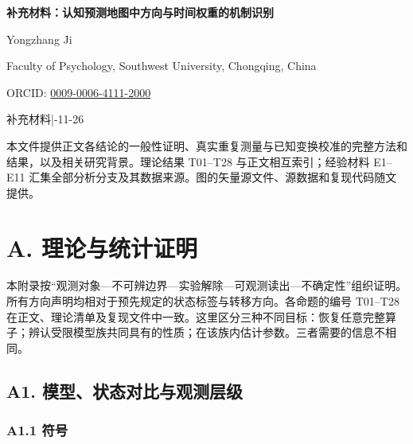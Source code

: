\documentclass[11pt,a4paper]{article}
\begin{document}
\thispagestyle{plain}
{\raggedright{}\sffamily\bfseries\color{Ink}\fontsize{20}{25}\selectfont 补充材料：认知预测地图中方向与时间权重的机制识别\par}
\vspace{8pt}
{\sffamily\fontsize{12}{15}\selectfont Yongzhang Ji\par}
\vspace{4pt}
{\sffamily\small Faculty of Psychology, Southwest University, Chongqing,
China\par}
\vspace{3pt}
{\sffamily\footnotesize\color{Muted} ORCID: \href{https://orcid.org/0009-0006-4111-2000}{0009-0006-4111-2000}\par}
\vspace{7pt}
{\sffamily\footnotesize\color{Muted} 补充材料\quad |-11-26\par}
\vspace{8pt}
本文件提供正文各结论的一般性证明、真实重复测量与已知变换校准的完整方法和结果，以及相关研究背景。理论结果
T01–T28 与正文相互索引；经验材料 E1–E11
汇集全部分析分支及其数据来源。图的矢量源文件、源数据和复现代码随文提供。

\begingroup
\fontsize{8.8}{10.3}\selectfont
\linespread{1.0}\selectfont
\setlength{\parskip}{0pt}
\tableofcontents
\endgroup

\clearpage

\section{A.
理论与统计证明}\label{a.-ux7406ux8bbaux4e0eux7edfux8ba1ux8bc1ux660e}

本附录按“观测对象—不可辨边界—实验解除—可观测读出—不确定性”组织证明。所有方向声明均相对于预先规定的状态标签与转移方向。各命题的编号
T01–T28
在正文、理论清单及复现文件中一致。这里区分三种不同目标：恢复任意完整算子；辨认受限模型族共同具有的性质；在该族内估计参数。三者需要的信息不相同。

\subsection{A1.
模型、状态对比与观测层级}\label{a1.-ux6a21ux578bux72b6ux6001ux5bf9ux6bd4ux4e0eux89c2ux6d4bux5c42ux7ea7}

\subsubsection{A1.1 符号}\label{a1.1-ux7b26ux53f7}
\end{document}
